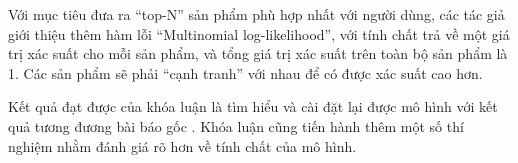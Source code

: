 Với mục tiêu đưa ra ``top-N'' sản phẩm phù hợp nhất với người dùng, các tác giả giới thiệu thêm hàm lỗi ``Multinomial log-likelihood'', với tính chất trả về một giá trị xác suất cho mỗi sản phẩm, và tổng giá trị xác suất trên toàn bộ sản phẩm là 1. Các sản phẩm sẽ phải ``cạnh tranh'' với nhau để có được xác suất cao hơn. 

Kết quả đạt được của khóa luận là tìm hiểu và cài đặt lại được mô hình với kết quả tương đương bài báo gốc \cite{mvae}. Khóa luận cũng tiến hành thêm một số thí nghiệm nhằm đánh giá rõ hơn về tính chất của mô hình.

